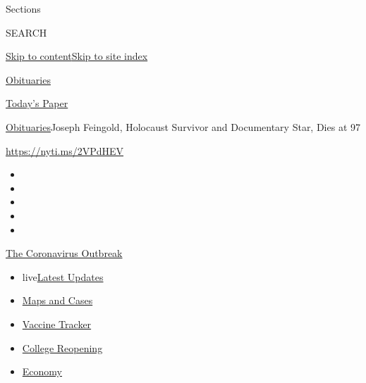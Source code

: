 Sections

SEARCH

\protect\hyperlink{site-content}{Skip to
content}\protect\hyperlink{site-index}{Skip to site index}

\href{https://www.nytimes3xbfgragh.onion/section/obituaries}{Obituaries}

\href{https://myaccount.nytimes3xbfgragh.onion/auth/login?response_type=cookie\&client_id=vi}{}

\href{https://www.nytimes3xbfgragh.onion/section/todayspaper}{Today's
Paper}

\href{/section/obituaries}{Obituaries}\textbar{}Joseph Feingold,
Holocaust Survivor and Documentary Star, Dies at 97

\url{https://nyti.ms/2VPdHEV}

\begin{itemize}
\item
\item
\item
\item
\item
\end{itemize}

\href{https://www.nytimes3xbfgragh.onion/news-event/coronavirus?action=click\&pgtype=Article\&state=default\&region=TOP_BANNER\&context=storylines_menu}{The
Coronavirus Outbreak}

\begin{itemize}
\tightlist
\item
  live\href{https://www.nytimes3xbfgragh.onion/2020/08/04/world/coronavirus-covid-19.html?action=click\&pgtype=Article\&state=default\&region=TOP_BANNER\&context=storylines_menu}{Latest
  Updates}
\item
  \href{https://www.nytimes3xbfgragh.onion/interactive/2020/us/coronavirus-us-cases.html?action=click\&pgtype=Article\&state=default\&region=TOP_BANNER\&context=storylines_menu}{Maps
  and Cases}
\item
  \href{https://www.nytimes3xbfgragh.onion/interactive/2020/science/coronavirus-vaccine-tracker.html?action=click\&pgtype=Article\&state=default\&region=TOP_BANNER\&context=storylines_menu}{Vaccine
  Tracker}
\item
  \href{https://www.nytimes3xbfgragh.onion/2020/08/02/us/covid-college-reopening.html?action=click\&pgtype=Article\&state=default\&region=TOP_BANNER\&context=storylines_menu}{College
  Reopening}
\item
  \href{https://www.nytimes3xbfgragh.onion/live/2020/08/03/business/stock-market-today-coronavirus?action=click\&pgtype=Article\&state=default\&region=TOP_BANNER\&context=storylines_menu}{Economy}
\end{itemize}

